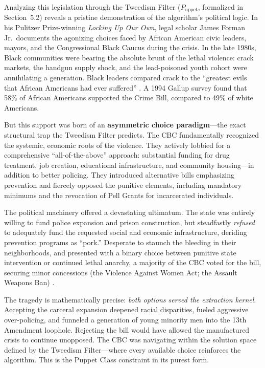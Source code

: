 \documentclass[12pt,openany]{book}
\begin{document}
Analyzing this legislation through the Tweedism Filter ($P_{\text{uppet}}$, formalized in Section~5.2) reveals a pristine demonstration of the algorithm's political logic. In his Pulitzer Prize-winning \textit{Locking Up Our Own}, legal scholar James Forman Jr.\ documents the agonizing choices faced by African American civic leaders, mayors, and the Congressional Black Caucus during the crisis. In the late 1980s, Black communities were bearing the absolute brunt of the lethal violence: crack markets, the handgun supply shock, and the lead-poisoned youth cohort were annihilating a generation. Black leaders compared crack to the ``greatest evils that African Americans had ever suffered'' \cite{forman}. A 1994 Gallup survey found that 58\% of African Americans supported the Crime Bill, compared to 49\% of white Americans.

But this support was born of an \textbf{asymmetric choice paradigm}---the exact structural trap the Tweedism Filter predicts. The CBC fundamentally recognized the systemic, economic roots of the violence. They actively lobbied for a comprehensive ``all-of-the-above'' approach: substantial funding for drug treatment, job creation, educational infrastructure, and community housing---in addition to better policing. They introduced alternative bills emphasizing prevention and fiercely opposed the punitive elements, including mandatory minimums and the revocation of Pell Grants for incarcerated individuals.

The political machinery offered a devastating ultimatum. The state was entirely willing to fund police expansion and prison construction, but steadfastly \textit{refused} to adequately fund the requested social and economic infrastructure, deriding prevention programs as ``pork.'' Desperate to staunch the bleeding in their neighborhoods, and presented with a binary choice between punitive state intervention or continued lethal anarchy, a majority of the CBC voted for the bill, securing minor concessions (the Violence Against Women Act; the Assault Weapons Ban) \cite{forman}.

The tragedy is mathematically precise: \textit{both options served the extraction kernel}. Accepting the carceral expansion deepened racial disparities, fueled aggressive over-policing, and funneled a generation of young minority men into the 13th Amendment loophole. Rejecting the bill would have allowed the manufactured crisis to continue unopposed. The CBC was navigating within the solution space defined by the Tweedism Filter---where every available choice reinforces the algorithm. This is the Puppet Class constraint in its purest form.
\end{document}
